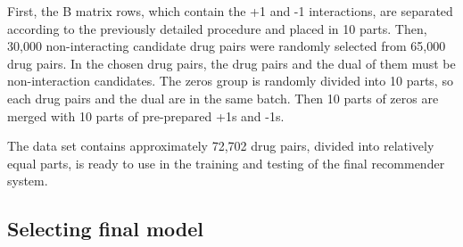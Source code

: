 \documentclass{bmcart}
\begin{document}
First, the B matrix rows, which contain the +1 and -1 interactions, are separated according to the previously detailed procedure and placed in 10 parts. Then, 30,000 non-interacting candidate drug pairs were randomly selected from 65,000 drug pairs. In the chosen drug pairs, the drug pairs and the dual of them must be non-interaction candidates. The zeros group is randomly divided into 10 parts, so each drug pairs and the dual are in the same batch. Then 10 parts of zeros are merged with 10 parts of pre-prepared +1s and -1s. 

The data set contains approximately 72,702 drug pairs, divided into relatively equal parts, is ready to use in the training and testing of the final recommender system.

\subsection*{Selecting final model}
\end{document}
